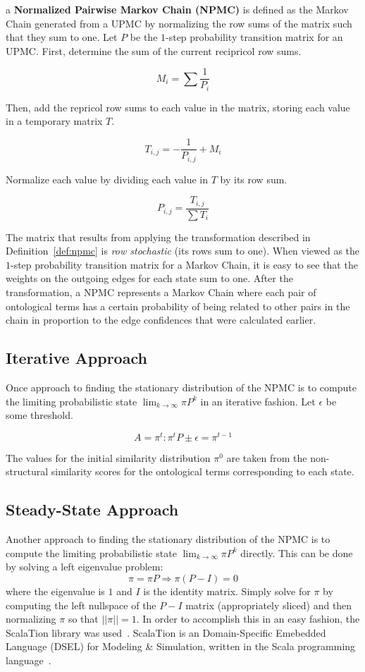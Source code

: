 \documentclass[letterpaper,twocolumn,12pt]{article}
\begin{document}
\begin{defn}
\label{def:npmc}
a {\bf Normalized Pairwise Markov Chain (NPMC)} is defined as the Markov Chain generated from a UPMC by normalizing the row sums of the matrix such that they sum to one. Let $P$ be the $1$-step probability transition matrix for an UPMC. 
First, determine the sum of the current recipricol row sums.

$$ M_i = \sum \frac{1}{P_i} $$

\noindent Then, add the repricol row sums to each value in the matrix, storing each value in a temporary matrix $T$.

$$ T_{i,j} = -\frac{1}{P_{i,j}} + M_i $$

\noindent Normalize each value by dividing each value in $T$ by its row sum.

$$ P_{i,j} = \frac{T_{i,j}}{\sum T_i} $$
\end{defn}

\noindent The matrix that results from applying the transformation described in Definition~\ref{def:npmc} is \textit{row stochastic} (its rows sum to one).
When viewed as the $1$-step probability transition matrix for a Markov Chain, it is easy to see that the weights on the outgoing edges for each state sum to one.
After the transformation, a NPMC represents a Markov Chain where each pair of ontological terms has a certain probability of being related to other pairs in the chain in proportion to the edge confidences that were calculated earlier.

\subsection{Iterative Approach}

Once approach to finding the stationary distribution of the NPMC is to compute the limiting probabilistic state $\lim_{k \to \infty} \pi P^k$ in an iterative fashion. 
Let $\epsilon$ be some threshold.

$$ A = \pi^t : \pi^t P \pm \epsilon = \pi^{t-1} $$

\noindent The values for the initial similarity distribution $\pi^0$ are taken from the non-structural similarity scores for the ontological terms corresponding to each state.

\subsection{Steady-State Approach}

Another approach to finding the stationary distribution of the NPMC is to compute the limiting probabilistic state $\lim_{k \to \infty} \pi P^k$ directly.
This can be done by solving a left eigenvalue problem: 
$$ \pi = \pi P \Rightarrow \pi (P - I) = 0$$
where the eigenvalue is $1$ and $I$ is the identity matrix. 
Simply solve for $\pi$ by computing the left nullspace of the $P - I$ matrix (appropriately sliced) and then normalizing $\pi$ so that $\vert\vert \pi \vert\vert = 1$.
In order to accomplish this in an easy fashion, the ScalaTion library was used~\cite{miller:2010:scalation}. ScalaTion is an Domain-Specific Emebedded Language (DSEL) for Modeling \& Simulation, written in the Scala programming language~\cite{odersky:2011:spec}.
\end{document}
